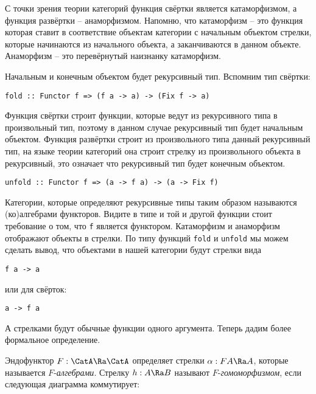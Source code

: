 С точки зрения теории категорий функция свёртки является катаморфизмом,
а функция развёртки -- анаморфизмом. Напомню, что катаморфизм -- это
функция которая ставит в соответствие объектам категории с начальным
объектом стрелки, которые начинаются из начального объекта, а
заканчиваются в данном объекте. Анаморфизм -- это перевёрнутый наизнанку
катаморфизм.

Начальным и конечным объектом будет рекурсивный тип. Вспомним тип
свёртки:

\begin{verbatim}
fold :: Functor f => (f a -> a) -> (Fix f -> a)
\end{verbatim}

Функция свёртки строит функции, которые ведут из рекурсивного типа в
произвольный тип, поэтому в данном случае рекурсивный тип будет
начальным объектом. Функция развёртки строит из произвольного типа
данный рекурсивный тип, на языке теории категорий она строит стрелку из
произвольного объекта в рекурсивный, это означает что рекурсивный тип
будет конечным объектом.

\begin{verbatim}
unfold :: Functor f => (a -> f a) -> (a -> Fix f)
\end{verbatim}

Категории, которые определяют рекурсивные типы таким образом называются
(ко)алгебрами функторов. Видите в типе и той и другой функции стоит
требование о том, что \texttt{f} является функтором. Катаморфизм и
анаморфизм отображают объекты в стрелки. По типу функций \texttt{fold} и
\texttt{unfold} мы можем сделать вывод, что объектами в нашей категории
будут стрелки вида

\begin{verbatim}
f a -> a
\end{verbatim}

или для свёрток:

\begin{verbatim}
a -> f a
\end{verbatim}

А стрелками будут обычные функции одного аргумента. Теперь дадим более
формальное определение.

Эндофунктор $F : \CatA \Ra \CatA$ определяет стрелки
$\alpha : FA \Ra A$, которые называется $F$-\emph{алгебрами}. Стрелку
$h : A \Ra B$ называют $F$-\emph{гомоморфизмом}, если следующая
диаграмма коммутирует:

\begin{centering}



\end{centering}

